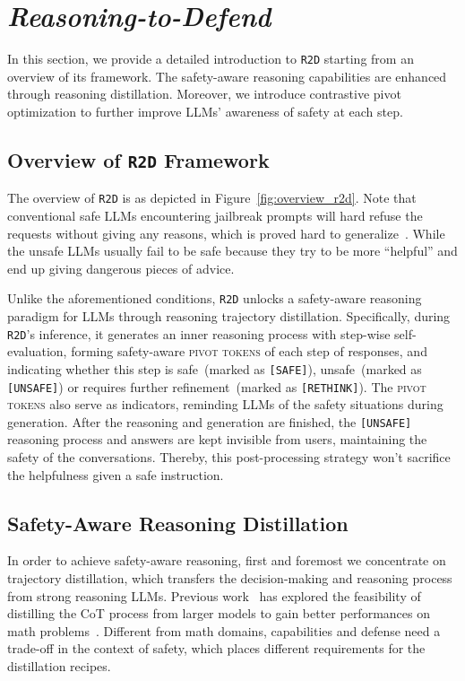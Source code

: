 \section{\textit{Reasoning-to-Defend}}
In this section, we provide a detailed introduction to \texttt{R2D} starting from an overview of its framework. The safety-aware reasoning capabilities are enhanced through reasoning distillation. Moreover, we introduce contrastive pivot optimization to further improve LLMs' awareness of safety at each step.

\subsection{Overview of \texttt{R2D} Framework}
The overview of \texttt{R2D} is as depicted in Figure~\ref{fig:overview_r2d}.
Note that conventional safe LLMs encountering jailbreak prompts will hard refuse the requests without giving any reasons, which is proved hard to generalize~\cite{andriushchenko2025does}. 
While the unsafe LLMs usually fail to be safe because they try to be more ``helpful'' and end up giving dangerous pieces of advice.

Unlike the aforementioned conditions, \texttt{R2D} unlocks a safety-aware reasoning paradigm for LLMs through reasoning trajectory distillation. Specifically, during \texttt{R2D}'s inference, it generates an inner reasoning process with step-wise self-evaluation, forming safety-aware \textsc{pivot tokens} of each step of responses, and indicating whether this step is safe~(marked as \texttt{[SAFE]}), unsafe~(marked as \texttt{[UNSAFE]}) or requires further refinement~(marked as \texttt{[RETHINK]}). The \textsc{pivot tokens} also serve as indicators, reminding LLMs of the safety situations during generation. After the reasoning and generation are finished, the \texttt{[UNSAFE]} reasoning process and answers are kept invisible from users, maintaining the safety of the conversations. Thereby, this post-processing strategy won't sacrifice the helpfulness given a safe instruction.

\subsection{Safety-Aware Reasoning Distillation}
In order to achieve safety-aware reasoning, first and foremost we concentrate on trajectory distillation, which transfers the decision-making and reasoning process from strong reasoning LLMs. Previous work~\cite{shridhar-etal-2023-distilling, li2024turning} has explored the feasibility of distilling the CoT process from larger models to gain better performances on math problems~\cite{cobbe2021training, hendrycks2021measuring}. Different from math domains, capabilities and defense need a trade-off in the context of safety, which places different requirements for the distillation recipes. 

